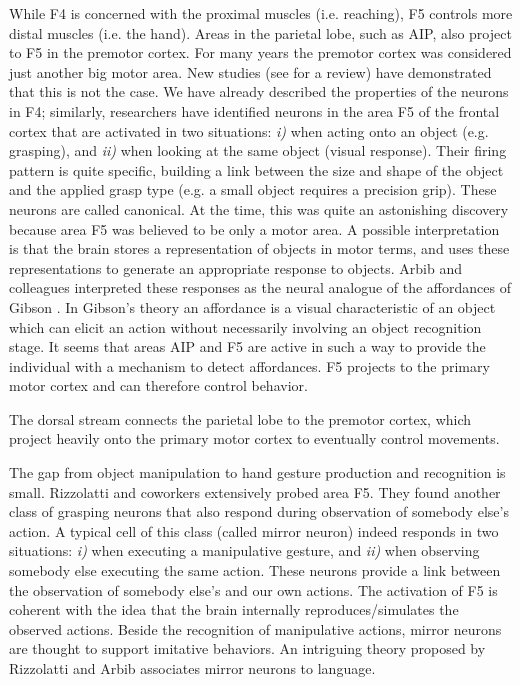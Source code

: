 While F4 is concerned with the proximal muscles (i.e. reaching), F5
controls more distal muscles (i.e. the hand). Areas in the parietal 
lobe, such as AIP, also project to F5 in the premotor cortex.
For many years the premotor cortex was considered
just another big motor area. New studies (see \cite{jeannerod97cognitive} for a review) 
have demonstrated that this is not the case. We have already described the
properties of the neurons in F4; similarly, researchers have 
identified neurons in the area F5 of the frontal cortex \cite{fadiga00visuomotor} 
that are activated in two situations: {\it i)} when acting onto an object 
(e.g. grasping), and {\it ii)} when looking at the same object (visual response). 
Their firing pattern is quite specific, building a link between the size 
and shape of the object and the applied grasp type (e.g. a small object 
requires a precision grip). These neurons are called canonical. At the time,
this was quite an astonishing discovery because area F5 was believed 
to be only a motor area. A possible interpretation is that the brain 
stores a representation of objects in motor terms, and uses these 
representations to generate an appropriate response to objects. 
Arbib and colleagues \cite{fagg-arbib-1998} interpreted
these responses as the neural analogue of the affordances of Gibson 
\cite{gibson77theory}. In Gibson's theory an affordance is a visual
characteristic of an object which can elicit an action without necessarily
involving an object recognition stage. It seems that areas AIP and F5 are 
active in such a way to provide the individual with a mechanism to 
detect affordances. F5 projects to the primary motor cortex and can 
therefore control behavior.

\ifverbose
The dorsal stream connects the parietal lobe to the premotor cortex,
which project heavily onto the primary motor cortex to eventually
control movements.
\fi

The gap from object manipulation to hand gesture production and 
recognition is small.
Rizzolatti and coworkers \cite{gallese-fadiga-fogassi-rizzolatti-1996}
extensively probed area F5. They found another class of grasping
neurons that also respond during observation of somebody else's action.
A typical cell of this class (called mirror neuron) indeed responds in two
situations: {\it i)} when executing a manipulative gesture, and {\it
ii)} when observing somebody else executing the same action. These
neurons provide a link between the observation of somebody else's
and our own actions. The activation of F5 is coherent with the idea
that the brain internally reproduces/simulates the observed actions.
Beside the recognition of manipulative actions, mirror neurons are 
thought to support imitative behaviors. An intriguing theory
proposed by Rizzolatti and Arbib \cite{rizzolatti98language}
associates mirror neurons to language.

